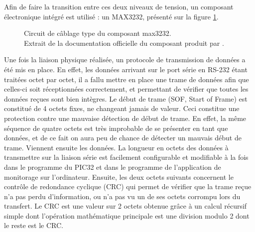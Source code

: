 \documentclass[letterpaper, twoside, 12pt, memoire, creativecommons, hyperref]{thETS}
\begin{document}
Afin de faire la transition entre ces deux niveaux de tension, un composant électronique intégré est utilisé : un MAX3232, présenté sur la figure \ref{fig:max3232}.

\begin{figure}
	\centering
	\caption{Circuit de câblage type du composant max3232. \\Extrait de la documentation officielle du composant produit par \cite{MAXIM3232}.}
	\label{fig:max3232}
\end{figure}

Une fois la liaison physique réalisée, un protocole de transmission de données a été mis en place. En effet, les données arrivant sur le port série en RS-232 étant traitées octet par octet, il a fallu mettre en place une trame de données afin que celles-ci soit réceptionnées correctement, et permettant de vérifier que toutes les données reçues sont bien intègres.
Le début de trame (SOF, Start of Frame) est constitué de 4 octets fixes, ne changeant jamais de valeur. Ceci constitue une protection contre une mauvaise détection de début de trame. En effet, la même séquence de quatre octets est très improbable de se présenter en tant que données, et de ce fait on aura peu de chance de détecter un mauvais début de trame. Viennent ensuite les données. La longueur en octets des données à transmettre sur la liaison série est facilement configurable et modifiable à la fois dans le programme du PIC32 et dans le programme de l'application de monitorage sur l'ordinateur.
Ensuite, les deux octets suivants concernent le contrôle de redondance cyclique (CRC) qui permet de vérifier que la trame reçue n'a pas perdu d'information, ou n'a pas vu un de ses octets corrompu lors du transfert. Le CRC est une valeur sur 2 octets obtenue grâce à un calcul récursif simple dont l'opération mathématique principale est une division modulo 2 dont le reste est le CRC. %
\end{document}
